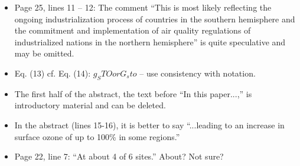 \documentclass{scrartcl}
\begin{document}
\begin{itemize}
{be too different from those in Luhar et al. (2017).} \emph{}
\item {\color{blue}  Page 25, lines 11 -- 12: The comment “This is most likely reflecting the ongoing
industrialization process of countries in the southern hemisphere and the commitment
and implementation of air quality regulations of industrialized nations in the northern
hemisphere” is quite speculative and may be omitted.} \emph{}
\item {\color{blue}  Eq. (13) cf. Eq. (14): $g_STO or G_sto$ -- use consistency with notation.} \emph{}
\item {\color{blue}  The first half of the abstract, the text before “In this paper...,” is introductory
material and can be deleted.} \emph{}
\item {\color{blue}  In the abstract (lines 15-16), it is better to say “...leading to an increase in surface
ozone of up to 100\% in some regions.”} \emph{}
\item {\color{blue}  Page 22, line 7: “At about 4 of 6 sites.” About? Not sure?} \emph{}
\end{itemize}
\newpage
\end{document}
